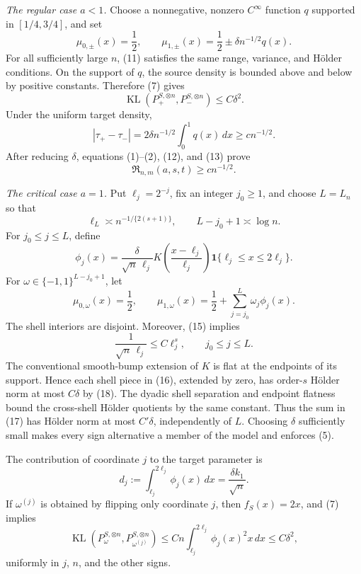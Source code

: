 \emph{The regular case \(a<1\).}
Choose a nonnegative, nonzero \(C^\infty\) function \(q\) supported in \([1/4,3/4]\), and set
\[
 \mu_{0,\pm}(x)=\frac12,
 \qquad
 \mu_{1,\pm}(x)=\frac12\pm\delta n^{-1/2}q(x).
\tag{11}
\]
For all sufficiently large \(n\), (11) satisfies the same range, variance, and H\"older conditions.  On the support of \(q\), the source density is bounded above and below by positive constants.  Therefore (7) gives
\[
 \operatorname{KL}(P_+^{S,\otimes n},P_-^{S,\otimes n})
 \le C\delta^2.
\tag{12}
\]
Under the uniform target density,
\[
 |\tau_+-\tau_-|
 =2\delta n^{-1/2}\int_0^1q(x)\,dx
 \ge c n^{-1/2}.
\tag{13}
\]
After reducing \(\delta\), equations (1)--(2), (12), and (13) prove
\[
 \mathfrak R_{n,m}(a,s,t)\ge c n^{-1/2}.
\tag{14}
\]

\emph{The critical case \(a=1\).}
Put \(\ell_j=2^{-j}\), fix an integer \(j_0\ge1\), and choose \(L=L_n\) so that
\[
 \ell_L\asymp n^{-1/\{2(s+1)\}},
 \qquad
 L-j_0+1\asymp\log n.
\tag{15}
\]
For \(j_0\le j\le L\), define
\[
 \phi_j(x)=\frac{\delta}{\sqrt n\,\ell_j}
 K\!\left(\frac{x-\ell_j}{\ell_j}\right)
 \mathbf 1\{\ell_j\le x\le2\ell_j\}.
\tag{16}
\]
For \(\omega\in\{-1,1\}^{L-j_0+1}\), let
\[
 \mu_{0,\omega}(x)=\frac12,
 \qquad
 \mu_{1,\omega}(x)=\frac12+
 \sum_{j=j_0}^L\omega_j\phi_j(x).
\tag{17}
\]
The shell interiors are disjoint.  Moreover, (15) implies
\[
 \frac1{\sqrt n\,\ell_j}
 \le C\ell_j^s,
 \qquad j_0\le j\le L.
\tag{18}
\]
The conventional smooth-bump extension of \(K\) is flat at the endpoints of its support.  Hence each shell piece in (16), extended by zero, has order-\(s\) H\"older norm at most \(C\delta\) by (18).  The dyadic shell separation and endpoint flatness bound the cross-shell H\"older quotients by the same constant.  Thus the sum in (17) has H\"older norm at most \(C'\delta\), independently of \(L\).  Choosing \(\delta\) sufficiently small makes every sign alternative a member of the model and enforces (5).

The contribution of coordinate \(j\) to the target parameter is
\[
 d_j:=\int_{\ell_j}^{2\ell_j}\phi_j(x)\,dx
 =\frac{\delta k_1}{\sqrt n}.
\tag{19}
\]
If \(\omega^{(j)}\) is obtained by flipping only coordinate \(j\), then \(f_S(x)=2x\), and (7) implies
\[
 \operatorname{KL}(P_\omega^{S,\otimes n},
                    P_{\omega^{(j)}}^{S,\otimes n})
 \le Cn\int_{\ell_j}^{2\ell_j}\phi_j(x)^2x\,dx
 \le C\delta^2,
\tag{20}
\]
uniformly in \(j\), \(n\), and the other signs.

